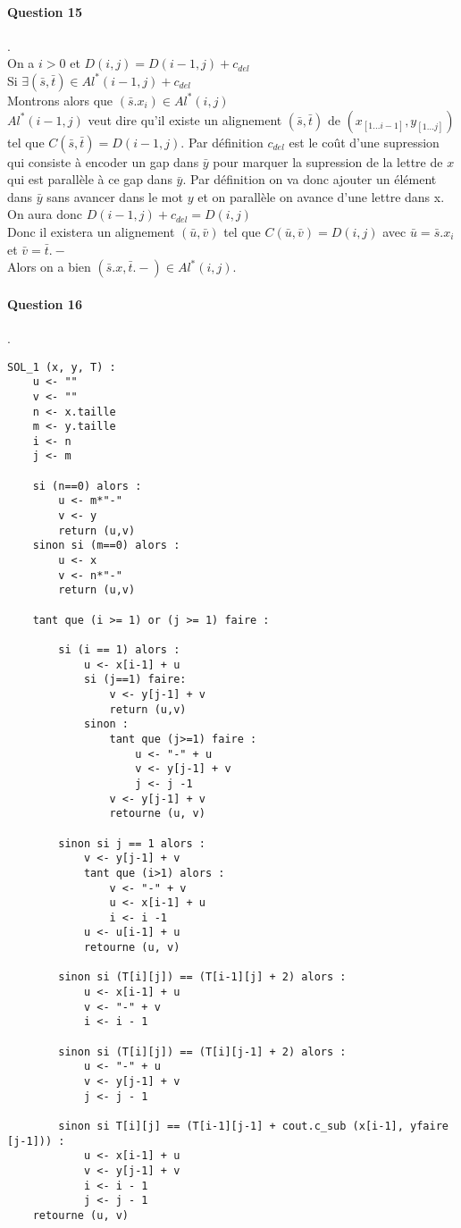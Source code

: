 \paragraph{Question 15}.\\
On a $i > 0$ et $D(i,j) = D(i-1,j)+c_{del}$\\
Si $\exists(\bar s, \bar t) \in Al^*(i-1,j)+c_{del}$\\
Montrons alors que $(\bar s.x_i)\in Al^*(i,j)$\\
$Al^*(i-1,j)$ veut dire qu'il existe un alignement $(\bar s, \bar t)$ de $(x_[1...i-1], y_[1...j])$ tel que $C(\bar s, \bar t) = D(i-1, j)$. Par définition $c_{del}$ est le coût d'une supression qui consiste à encoder un gap dans $\bar y$ pour marquer la supression de la lettre de $x$ qui est parallèle à ce gap dans $\bar y$.
Par définition on va donc ajouter un élément dans $\bar y$ sans avancer dans le mot $y$ et on parallèle on avance d'une lettre dans x.\\
On aura donc $D(i-1,j)+c_{del} = D(i,j)$\\
Donc il existera un alignement $(\bar u, \bar v)$ tel que $C(\bar u, \bar v) = D(i,j)$ avec $\bar u = \bar s.x_i$ et $\bar v = \bar t.-$\\
Alors on a bien $(\bar s.x, \bar t.-) \in Al^*(i,j)$.
\paragraph{Question 16}.\\
\begin{lstlisting}
SOL_1 (x, y, T) :
    u <- ""
    v <- ""
    n <- x.taille
    m <- y.taille
    i <- n
    j <- m

    si (n==0) alors :
        u <- m*"-"
        v <- y
        return (u,v)
    sinon si (m==0) alors :
        u <- x
        v <- n*"-"
        return (u,v)

    tant que (i >= 1) or (j >= 1) faire :

        si (i == 1) alors :
            u <- x[i-1] + u
            si (j==1) faire:
                v <- y[j-1] + v
                return (u,v)
            sinon :
                tant que (j>=1) faire :
                    u <- "-" + u
                    v <- y[j-1] + v
                    j <- j -1
                v <- y[j-1] + v
                retourne (u, v)

        sinon si j == 1 alors :
            v <- y[j-1] + v
            tant que (i>1) alors :
                v <- "-" + v
                u <- x[i-1] + u
                i <- i -1
            u <- u[i-1] + u
            retourne (u, v)

        sinon si (T[i][j]) == (T[i-1][j] + 2) alors :
            u <- x[i-1] + u
            v <- "-" + v
            i <- i - 1

        sinon si (T[i][j]) == (T[i][j-1] + 2) alors :
            u <- "-" + u
            v <- y[j-1] + v
            j <- j - 1

        sinon si T[i][j] == (T[i-1][j-1] + cout.c_sub (x[i-1], yfaire [j-1])) :
            u <- x[i-1] + u
            v <- y[j-1] + v
            i <- i - 1
            j <- j - 1
    retourne (u, v)
\end{lstlisting}
